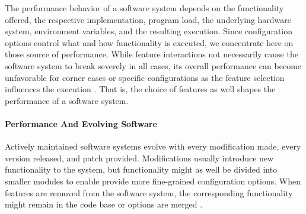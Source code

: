 The performance behavior of a software system depends on the functionality
offered, the respective implementation, program load, the underlying hardware system,
environment variables, and the resulting execution. Since configuration options
control what and how functionality is executed, we concentrate here on those
source of performance. While feature interactions not necessarily cause the
software system to break severely in all cases, its overall performance can
become unfavorable for corner cases or specific configurations as the feature
selection influences the execution \citep{foo_mining_2010,heger_automated_2013,nguyen_industrial_2014}. 
That is, the choice of features as well shapes the performance of a software system.

\paragraph{Performance And Evolving Software}
Actively maintained software systems evolve with every modification made, every
version released,  and patch provided. Modifications usually introduce new
functionality to the system, but functionality might as well be divided into
smaller modules to enable provide more fine-grained configuration options. When
features are removed from the software system, the corresponding functionality
might remain in the code base or options are merged
\citep{apel_feature-oriented_2013}.

